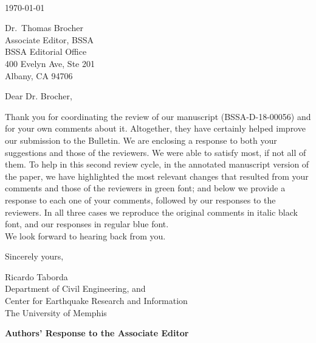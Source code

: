 \documentclass{article}
\begin{document}

\thispagestyle{empty}
\setcounter{page}{0}

~

\vspace{6em}
\noindent\today

\vspace{5em}
\noindent
Dr.~Thomas Brocher\\
Associate Editor, BSSA\\
BSSA Editorial Office\\
400 Evelyn Ave, Ste 201\\
Albany, CA 94706

\vspace{4em}
\noindent
Dear Dr. Brocher,

\vspace{1em}
\noindent
Thank you for coordinating the review of our manuscript (BSSA-D-18-00056) and for your own comments about it. Altogether, they have certainly helped improve our submission to the Bulletin. We are enclosing a response to both your suggestions and those of the reviewers. We were able to satisfy most, if not all of them. To help in this second review cycle, in the annotated manuscript version of the paper, we have highlighted the most relevant changes that resulted from your comments and those of the reviewers in green font; and below we provide a response to each one of your comments, followed by our responses to the reviewers. In all three cases we reproduce the original comments in italic black font, and our responses in regular blue font.\\

\noindent
We look forward to hearing back from you.

\vspace{2em}
\noindent
Sincerely yours,


\vspace{5em}
\noindent
Ricardo Taborda\\
Department of Civil Engineering, and\\
Center for Earthquake Research and Information\\
The University of Memphis

\newpage
\begin{center}
	\bf
	\large
	Authors' Response to the Associate Editor
\end{center}
\end{document}
